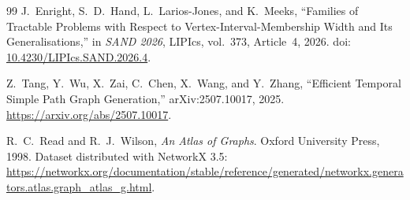 \begin{thebibliography}{99}
J.~Enright, S.~D.~Hand, L.~Larios-Jones, and K.~Meeks,
``Families of Tractable Problems with Respect to Vertex-Interval-Membership Width and Its Generalisations,''
in \emph{SAND 2026}, LIPIcs, vol.~373, Article~4, 2026.
doi: \href{https://doi.org/10.4230/LIPIcs.SAND.2026.4}{10.4230/LIPIcs.SAND.2026.4}.

Z.~Tang, Y.~Wu, X.~Zai, C.~Chen, X.~Wang, and Y.~Zhang,
``Efficient Temporal Simple Path Graph Generation,''
arXiv:2507.10017, 2025.
\url{https://arxiv.org/abs/2507.10017}.

R.~C.~Read and R.~J.~Wilson,
\emph{An Atlas of Graphs}. Oxford University Press, 1998.
Dataset distributed with NetworkX 3.5:
\url{https://networkx.org/documentation/stable/reference/generated/networkx.generators.atlas.graph_atlas_g.html}.

\end{thebibliography}
